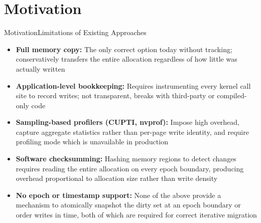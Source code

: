 \section{Motivation}


\begin{frame}{Motivation}{Limitations of Existing Approaches}
\begin{itemize}[<+->]
    \item \textbf{Full memory copy:} The only correct option today without tracking; conservatively transfers the entire allocation regardless of how little was actually written
    \item \textbf{Application-level bookkeeping:} Requires instrumenting every kernel call site to record writes; not transparent, breaks with third-party or compiled-only code
    \item \textbf{Sampling-based profilers (CUPTI, nvprof):} Impose high overhead, capture aggregate statistics rather than per-page write identity, and require profiling mode which is unavailable in production
    \item \textbf{Software checksumming:} Hashing memory regions to detect changes requires reading the entire allocation on every epoch boundary, producing overhead proportional to allocation size rather than write density
    \item \textbf{No epoch or timestamp support:} None of the above provide a mechanism to atomically snapshot the dirty set at an epoch boundary or order writes in time, both of which are required for correct iterative migration
\end{itemize}
\end{frame}


